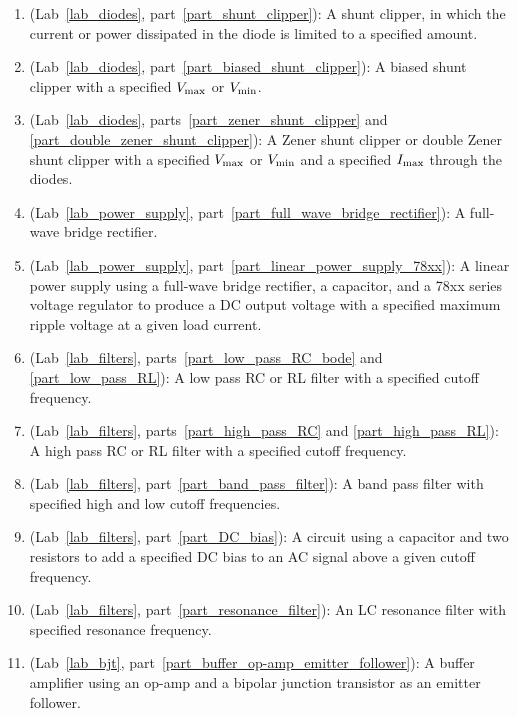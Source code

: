 \begin{flushleft}
\begin{enumerate}[align=left,leftmargin=*]
\item (Lab~\ref{lab_diodes}, part~\ref{part_shunt_clipper}): A shunt clipper, in which the current or power dissipated in the diode is limited to a specified amount.

\item (Lab~\ref{lab_diodes}, part~\ref{part_biased_shunt_clipper}): A biased shunt clipper with a specified $V_{\rm max}$ or $V_{\rm min}$.

\item (Lab~\ref{lab_diodes}, parts~\ref{part_zener_shunt_clipper} and \ref{part_double_zener_shunt_clipper}): A Zener shunt clipper or double Zener shunt clipper with a specified $V_{\rm max}$ or $V_{\rm min}$ and a specified $I_{\rm max}$ through the diodes.

\item (Lab~\ref{lab_power_supply}, part~\ref{part_full_wave_bridge_rectifier}): A full-wave bridge rectifier.

\item (Lab~\ref{lab_power_supply}, part~\ref{part_linear_power_supply_78xx}): A linear power supply using a full-wave bridge rectifier, a capacitor, and a 78xx series voltage regulator to produce a DC output voltage with a specified maximum ripple voltage at a given load current.

\item (Lab~\ref{lab_filters}, parts~\ref{part_low_pass_RC_bode} and \ref{part_low_pass_RL}): A low pass RC or RL filter with a specified cutoff frequency.

\item (Lab~\ref{lab_filters}, parts~\ref{part_high_pass_RC} and \ref{part_high_pass_RL}): A high  pass RC or RL filter with a specified cutoff frequency.

\item (Lab~\ref{lab_filters}, part~\ref{part_band_pass_filter}): A band pass filter with specified high and low cutoff frequencies.

\item (Lab~\ref{lab_filters}, part~\ref{part_DC_bias}): A circuit using a capacitor and two resistors to add a specified DC bias to an AC signal above a given cutoff frequency.

\item (Lab~\ref{lab_filters}, part~\ref{part_resonance_filter}): An LC resonance  filter with specified resonance frequency.

\item (Lab~\ref{lab_bjt}, part~\ref{part_buffer_op-amp_emitter_follower}): A buffer amplifier using an op-amp and a bipolar junction transistor as an emitter follower.


\end{enumerate}
\end{flushleft}
